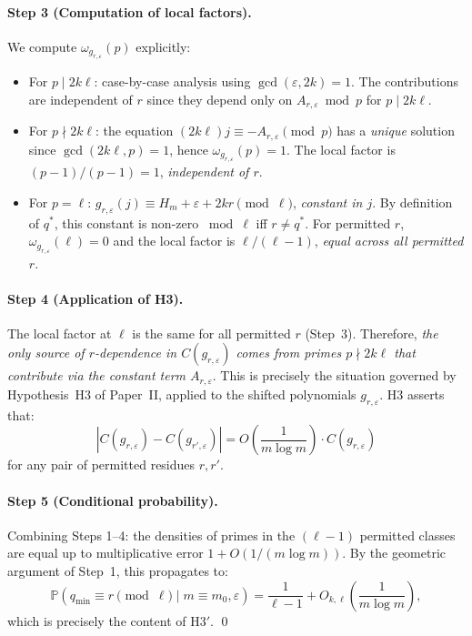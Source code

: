 \documentclass[11pt,a4paper]{article}
\theoremstyle{plain}
\theoremstyle{definition}
\newcommand{\qmin}{q_{\min}}
\newcommand{\Prb}{\mathbb{P}}
\newcommand{\eps}{\varepsilon}
\begin{document}
\paragraph{Step 3 (Computation of local factors).}
We compute $\omega_{g_{r, \eps}}(p)$ explicitly:
\begin{itemize}[leftmargin=*]
\item For $p \mid 2k\ell$: case-by-case analysis using $\gcd(\eps, 2k) = 1$.
The contributions are independent of $r$ since they depend only on
$A_{r, \eps} \bmod p$ for $p \mid 2k\ell$.
\item For $p \nmid 2k\ell$: the equation $(2k\ell) j \equiv -A_{r, \eps} \pmod p$
has a \emph{unique} solution since $\gcd(2k\ell, p) = 1$, hence
$\omega_{g_{r, \eps}}(p) = 1$. The local factor is $(p-1)/(p-1) = 1$,
\emph{independent of $r$}.
\item For $p = \ell$: $g_{r, \eps}(j) \equiv H_m + \eps + 2kr \pmod \ell$,
\emph{constant in $j$}. By definition of $q^*$, this constant is non-zero
$\bmod \ell$ iff $r \neq q^*$. For permitted $r$, $\omega_{g_{r, \eps}}(\ell) = 0$
and the local factor is $\ell/(\ell-1)$, \emph{equal across all permitted $r$}.
\end{itemize}

\paragraph{Step 4 (Application of H3).}
The local factor at $\ell$ is the same for all permitted $r$ (Step~3). Therefore,
\emph{the only source of $r$-dependence in $C(g_{r, \eps})$ comes from primes
$p \nmid 2k\ell$ that contribute via the constant term $A_{r, \eps}$}.
This is precisely the situation governed by Hypothesis~H3 of Paper~II, applied
to the shifted polynomials $g_{r, \eps}$. H3 asserts that:
\[
\left| C(g_{r, \eps}) - C(g_{r', \eps}) \right|
= O\!\left(\frac{1}{m \log m}\right) \cdot C(g_{r, \eps})
\]
for any pair of permitted residues $r, r'$.

\paragraph{Step 5 (Conditional probability).}
Combining Steps 1--4: the densities of primes in the $(\ell-1)$ permitted
classes are equal up to multiplicative error $1 + O(1/(m \log m))$. By the
geometric argument of Step~1, this propagates to:
\[
\Prb\!\left(\qmin \equiv r \pmod \ell \mid m \equiv m_0, \eps\right)
= \frac{1}{\ell - 1} + O_{k, \ell}\!\left(\frac{1}{m \log m}\right),
\]
which is precisely the content of H3$'$. \qed
\end{document}
